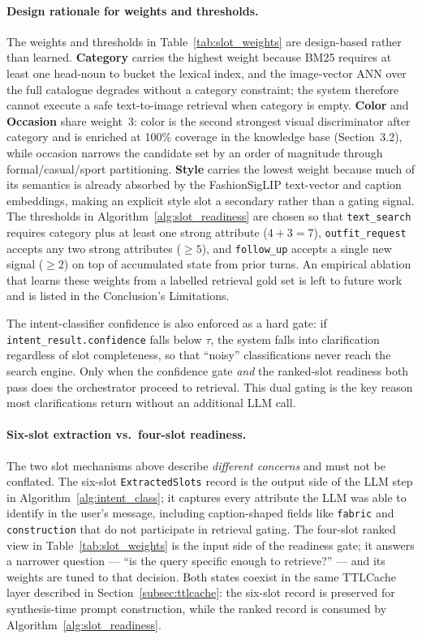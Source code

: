 \paragraph{Design rationale for weights and thresholds.}
The weights and thresholds in Table~\ref{tab:slot_weights} are design-based rather than learned. \textbf{Category} carries the highest weight because BM25 requires at least one head-noun to bucket the lexical index, and the image-vector ANN over the full catalogue degrades without a category constraint; the system therefore cannot execute a safe text-to-image retrieval when category is empty. \textbf{Color} and \textbf{Occasion} share weight~3: color is the second strongest visual discriminator after category and is enriched at 100\% coverage in the knowledge base (Section~3.2), while occasion narrows the candidate set by an order of magnitude through formal/casual/sport partitioning. \textbf{Style} carries the lowest weight because much of its semantics is already absorbed by the FashionSigLIP text-vector and caption embeddings, making an explicit style slot a secondary rather than a gating signal. The thresholds in Algorithm~\ref{alg:slot_readiness} are chosen so that \texttt{text\_search} requires category plus at least one strong attribute ($4{+}3{=}7$), \texttt{outfit\_request} accepts any two strong attributes ($\ge 5$), and \texttt{follow\_up} accepts a single new signal ($\ge 2$) on top of accumulated state from prior turns. An empirical ablation that learns these weights from a labelled retrieval gold set is left to future work and is listed in the Conclusion's Limitations.

The intent-classifier confidence is also enforced as a hard gate: if \texttt{intent\_result.confidence} falls below $\tau$, the system falls into clarification regardless of slot completeness, so that ``noisy'' classifications never reach the search engine. Only when the confidence gate \emph{and} the ranked-slot readiness both pass does the orchestrator proceed to retrieval. This dual gating is the key reason most clarifications return without an additional LLM call.

\paragraph{Six-slot extraction vs.\ four-slot readiness.}
The two slot mechanisms above describe \emph{different concerns} and must not be conflated. The six-slot \texttt{ExtractedSlots} record is the output side of the LLM step in Algorithm~\ref{alg:intent_class}; it captures every attribute the LLM was able to identify in the user's message, including caption-shaped fields like \texttt{fabric} and \texttt{construction} that do not participate in retrieval gating. The four-slot ranked view in Table~\ref{tab:slot_weights} is the input side of the readiness gate; it answers a narrower question --- ``is the query specific enough to retrieve?'' --- and its weights are tuned to that decision. Both states coexist in the same TTLCache layer described in Section~\ref{subsec:ttlcache}: the six-slot record is preserved for synthesis-time prompt construction, while the ranked record is consumed by Algorithm~\ref{alg:slot_readiness}.

